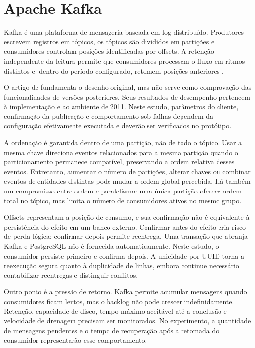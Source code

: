 \section{Apache Kafka}

Kafka é uma plataforma de mensageria baseada em log distribuído. Produtores escrevem registros em tópicos, os tópicos são divididos em partições e consumidores controlam posições identificadas por offsets. A retenção independente da leitura permite que consumidores processem o fluxo em ritmos distintos e, dentro do período configurado, retomem posições anteriores \cite{kreps2011}.

O artigo de  fundamenta o desenho original, mas não serve como comprovação das funcionalidades de versões posteriores. Seus resultados de desempenho pertencem à implementação e ao ambiente de 2011. Neste estudo, parâmetros do cliente, confirmação da publicação e comportamento sob falhas dependem da configuração efetivamente executada e deverão ser verificados no protótipo.

A ordenação é garantida dentro de uma partição, não de todo o tópico. Usar a mesma chave direciona eventos relacionados para a mesma partição quando o particionamento permanece compatível, preservando a ordem relativa desses eventos. Entretanto, aumentar o número de partições, alterar chaves ou combinar eventos de entidades distintas pode mudar a ordem global percebida. Há também um compromisso entre ordem e paralelismo: uma única partição oferece ordem total no tópico, mas limita o número de consumidores ativos no mesmo grupo.

Offsets representam a posição de consumo, e sua confirmação não é equivalente à persistência do efeito em um banco externo. Confirmar antes do efeito cria risco de perda lógica; confirmar depois permite reentrega. Uma transação que abranja Kafka e PostgreSQL não é fornecida automaticamente. Neste estudo, o consumidor persiste primeiro e confirma depois. A unicidade por UUID torna a reexecução segura quanto à duplicidade de linhas, embora continue necessário contabilizar reentregas e distinguir conflitos.

Outro ponto é a pressão de retorno. Kafka permite acumular mensagens quando consumidores ficam lentos, mas o backlog não pode crescer indefinidamente. Retenção, capacidade de disco, tempo máximo aceitável até a conclusão e velocidade de drenagem precisam ser monitorados. No experimento, a quantidade de mensagens pendentes e o tempo de recuperação após a retomada do consumidor representarão esse comportamento.

